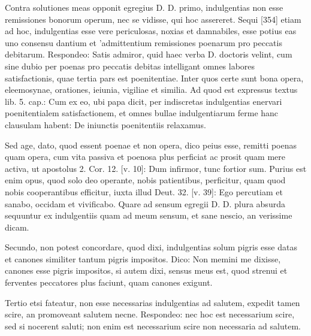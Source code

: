 Contra solutiones meas opponit egregius D. D. primo, indulgentias non esse remissiones bonorum operum, nec se vidisse, qui hoc assereret. Sequi [354] etiam ad hoc, indulgentias esse vere periculosas, noxias et damnabiles, esse potius eas uno consensu dantium et 'admittentium remissiones poenarum pro peccatis debitarum. Respondeo: Satis admiror, quid haec verba D. doctoris velint, cum sine dubio per poenas pro peccatis debitas intelligant omnes labores satisfactionis, quae tertia pars est poenitentiae. Inter quos certe sunt bona opera, eleemosynae, orationes, ieiunia, vigiliae et similia. Ad quod est expressus textus lib. 5. cap.: Cum ex eo, ubi papa dicit, per indiscretas indulgentias enervari poenitentialem satisfactionem, et omnes bullae indulgentiarum ferme hanc clausulam habent: De iniunctis poenitentiis relaxamus.

Sed age, dato, quod essent poenae et non opera, dico peius esse, remitti poenas quam opera, cum vita passiva et poenosa plus perficiat ac prosit quam mere activa, ut apostolus 2. Cor. 12. [v. 10]: Dum infirmor, tunc fortior sum. Purius est enim opus, quod solo deo operante, nobis patientibus, perficitur, quam quod nobis cooperantibus efficitur, iuxta illud Deut. 32. [v. 39]: Ego percutiam et sanabo, occidam et vivificabo. Quare ad sensum egregii D. D. plura absurda sequuntur ex indulgentiis quam ad meum sensum, et sane nescio, an verissime dicam.

Secundo, non potest concordare, quod dixi, indulgentias solum pigris esse datas et canones similiter tantum pigris impositos. Dico: Non memini me dixisse, canones esse pigris impositos, si autem dixi, sensus meus est, quod strenui et ferventes peccatores plus faciunt, quam canones exigunt.

Tertio etsi fateatur, non esse necessarias indulgentias ad salutem, expedit tamen scire, an promoveant salutem necne. Respondeo: nec hoc est necessarium scire, sed si nocerent saluti; non enim est necessarium scire non necessaria ad salutem.

